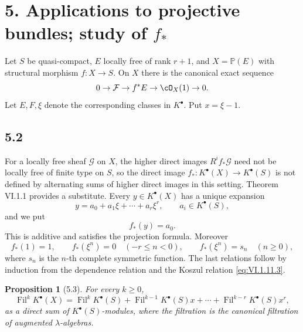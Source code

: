 \documentclass[11pt]{article}
\theoremstyle{plain}
\newtheorem{proposition}[theorem]{Proposition}
\theoremstyle{definition}
\theoremstyle{remark}
\providecommand{\Fil}{\operatorname{Fil}}
\begin{document}
\section*{5. Applications to projective bundles; study of $f_*$}

Let $S$ be quasi-compact, $E$ locally free of rank $r+1$, and $X=\mathbb P(E)$ with structural morphism $f:X\to S$. On $X$ there is the canonical exact sequence
\[
0\to \mathcal F\to f^*E\to\cO_X(1)\to 0.
\]
Let $E,F,\xi$ denote the corresponding classes in $K^{\bullet}$. Put $x=\xi-1$.

\subsection*{5.2}
For a locally free sheaf $\mathcal G$ on $X$, the higher direct images $R^if_*\mathcal G$ need not be locally free of finite type on $S$, so the direct image $f_*:K^{\bullet}(X)\to K^{\bullet}(S)$ is not defined by alternating sums of higher direct images in this setting. Theorem VI.1.1 provides a substitute. Every $y\in K^{\bullet}(X)$ has a unique expansion
\begin{equation}\label{eq:VI.5.2.1}
y=a_0+a_1\xi+\cdots+a_r\xi^r,
\qquad a_i\in K^{\bullet}(S),
\end{equation}
and we put
\begin{equation}\label{eq:VI.5.2.2}
f_*(y)=a_0.
\end{equation}
This is additive and satisfies the projection formula. Moreover
\begin{equation}\label{eq:VI.5.2.3}
f_*(1)=1,
\qquad
f_*(\xi^n)=0\quad(-r\leq n<0),
\qquad
f_*(\xi^n)=s_n\quad(n\geq 0),
\end{equation}
where $s_n$ is the $n$-th complete symmetric function. The last relations follow by induction from the dependence relation and the Koszul relation \eqref{eq:VI.1.11.3}.

\begin{proposition}[5.3]\label{prop:VI.5.3}
For every $k\geq 0$,
\begin{equation}\label{eq:VI.5.3}
\Fil^kK^{\bullet}(X)=\Fil^kK^{\bullet}(S)+\Fil^{k-1}K^{\bullet}(S)x+\cdots+\Fil^{k-r}K^{\bullet}(S)x^r,
\end{equation}
as a direct sum of $K^{\bullet}(S)$-modules, where the filtration is the canonical filtration of augmented $\lambda$-algebras.
\end{proposition}
\end{document}
